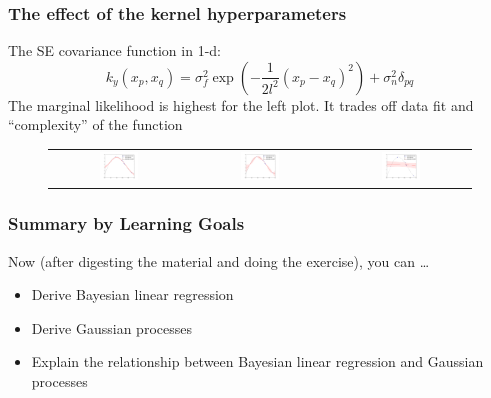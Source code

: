 \begin{frame}
\frametitle{The effect of the kernel hyperparameters}
The SE covariance function in 1-d:
  \renewcommand\theequation{2.\thedefcounter}
  \setcounter{defcounter}{31}
  \begin{equation}
	k_y(x_p, x_q) = \sigma_f^2 \exp (- \frac{1}{2l^2} (x_p- x_q)^2) + \sigma_n^2 \delta_{pq}
  \end{equation}
The marginal likelihood is highest for the left plot. It trades off data fit and ``complexity'' of the function
\begin{figure}
\begin{tabular}{ccc}
    \includegraphics[width=0.3\textwidth]{images/plots/gp_kernel_params_0.png} &
    \includegraphics[width=0.3\textwidth]{images/plots/gp_kernel_params_1.png} &
    \includegraphics[width=0.3\textwidth]{images/plots/gp_kernel_params_2.png} \\
\end{tabular}
\end{figure}
\end{frame}


\begin{frame}
\frametitle{Summary by Learning Goals}
Now (after digesting the material and doing the exercise), you can \ldots
\begin{itemize}
\item Derive Bayesian linear regression
\item Derive Gaussian processes
\item Explain the relationship between Bayesian linear regression and Gaussian processes
\end{itemize}

\end{frame}



